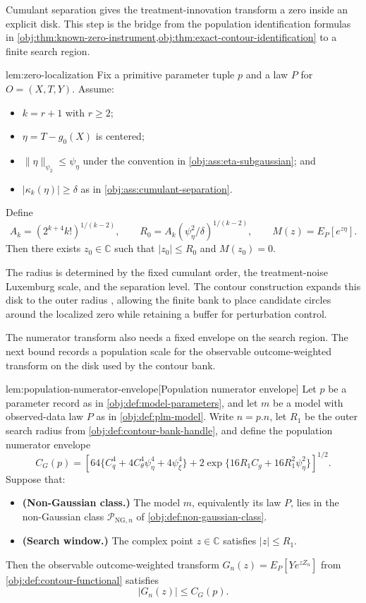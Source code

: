 Cumulant separation gives the treatment-innovation transform a zero inside an explicit disk. This step is the bridge from the population identification formulas in \cref{obj:thm:known-zero-instrument,obj:thm:exact-contour-identification} to a finite search region.

\begin{lemmav}{lem:zero-localization}
Fix a primitive parameter tuple \(p\) and a law \(P\) for \(O=(X,T,Y)\). Assume:
\begin{itemize}
\item \(k=r+1\) with \(r\ge2\);
\item \(\eta=T-g_0(X)\) is centered;
\item \(\|\eta\|_{\psi_2}\le\psi_{\eta}\) under the convention in \cref{obj:ass:eta-subgaussian}; and
\item \(|\kappa_k(\eta)|\ge\delta\) as in \cref{obj:ass:cumulant-separation}.
\end{itemize}
Define
\[
A_k=(2^{k+4}k!)^{1/(k-2)},\qquad
R_0=A_k(\psi_{\eta}^2/\delta)^{1/(k-2)},\qquad
M(z)=E_P[e^{z\eta}].
\]
Then there exists \(z_0\in\mathbb C\) such that \(|z_0|\le R_0\) and \(M(z_0)=0\).
\end{lemmav}

The radius  is determined by the fixed cumulant order, the treatment-noise Luxemburg scale, and the separation level. The contour construction expands this disk to the outer radius , allowing the finite bank to place candidate circles around the localized zero while retaining a buffer for perturbation control.

The numerator transform also needs a fixed envelope on the search region. The next bound records a population scale for the observable outcome-weighted transform on the disk used by the contour bank.

\begin{lemmav}{lem:population-numerator-envelope}[Population numerator envelope]
Let \(p\) be a parameter record as in \cref{obj:def:model-parameters}, and let \(m\) be a model with observed-data law \(P\) as in \cref{obj:def:plm-model}. Write \(n=p.n\), let \(R_1\) be the outer search radius from \cref{obj:def:contour-bank-handle}, and define the population numerator envelope
\[
C_G(p)
=
\left[
64\{C_q^4+4C_{\theta}^4\psi_{\eta}^4+4\psi_{\xi}^4\}
+
2\exp\{16R_1C_g+16R_1^2\psi_{\eta}^2\}
\right]^{1/2}.
\]
Suppose that:
\begin{itemize}
\item \textbf{(Non-Gaussian class.)} The model \(m\), equivalently its law \(P\), lies in the non-Gaussian class \(\mathcal P_{\mathrm{NG},n}\) of \cref{obj:def:non-gaussian-class}.
\item \textbf{(Search window.)} The complex point \(z\in\mathbb C\) satisfies \(|z|\le R_1\).
\end{itemize}
Then the observable outcome-weighted transform \(G_n(z)=E_P[Ye^{zZ_n}]\) from \cref{obj:def:contour-functional} satisfies
\[
|G_n(z)|\le C_G(p).
\]
\end{lemmav}

